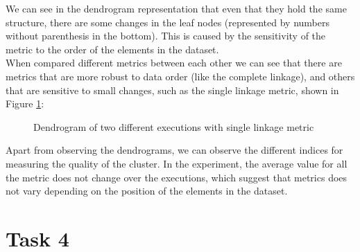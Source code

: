\documentclass[12pt]{article}
\begin{document}
We can see in the dendrogram representation that even that they hold the same structure, there are some changes in the leaf nodes (represented by numbers without parenthesis in the bottom). This is caused by the sensitivity of the metric to the order of the elements in the dataset.\\

When compared different metrics between each other we can see that there are metrics that are more robust to data order (like the complete linkage), and others that are sensitive to small changes, such as the single linkage metric, shown in Figure \ref{fig:dendro-single-linkage}:

\begin{figure}[H]
\centering
{}
\caption{Dendrogram of two different executions with single linkage metric}
\label{fig:dendro-single-linkage}
\end{figure}

Apart from observing the dendrograms, we can observe the different indices for measuring the quality of the cluster. In the experiment, the average value for all the metric does not change over the executions, which suggest that metrics does not vary depending on the position of the elements in the dataset.

\section{Task 4}
\end{document}
